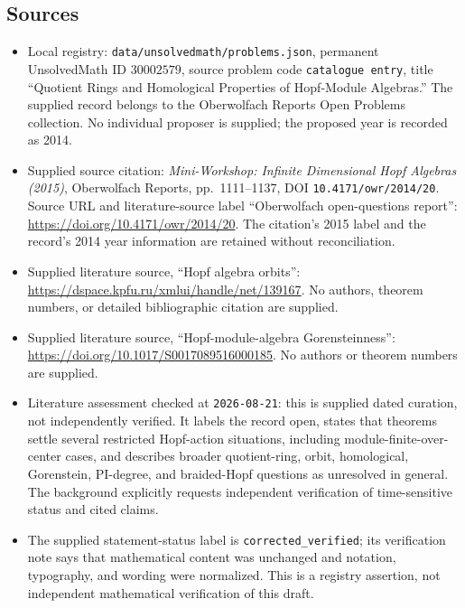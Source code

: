 \documentclass[11pt]{article}
\begin{document}
\subsection{Sources}
\begin{itemize}
\item Local registry: \texttt{data/unsolvedmath/problems.json}, permanent UnsolvedMath ID \(30002579\), source problem code \texttt{catalogue entry}, title ``Quotient Rings and Homological Properties of Hopf-Module Algebras.'' The supplied record belongs to the Oberwolfach Reports Open Problems collection. No individual proposer is supplied; the proposed year is recorded as 2014.
\item Supplied source citation: \emph{Mini-Workshop: Infinite Dimensional Hopf Algebras (2015)}, Oberwolfach Reports, pp.\ 1111--1137, DOI \texttt{10.4171/owr/2014/20}. Source URL and literature-source label ``Oberwolfach open-questions report'': \url{https://doi.org/10.4171/owr/2014/20}. The citation's 2015 label and the record's 2014 year information are retained without reconciliation.
\item Supplied literature source, ``Hopf algebra orbits'': \url{https://dspace.kpfu.ru/xmlui/handle/net/139167}. No authors, theorem numbers, or detailed bibliographic citation are supplied.
\item Supplied literature source, ``Hopf-module-algebra Gorensteinness'': \url{https://doi.org/10.1017/S0017089516000185}. No authors or theorem numbers are supplied.
\item Literature assessment checked at \texttt{2026-08-21}: this is supplied dated curation, not independently verified. It labels the record open, states that theorems settle several restricted Hopf-action situations, including module-finite-over-center cases, and describes broader quotient-ring, orbit, homological, Gorenstein, PI-degree, and braided-Hopf questions as unresolved in general. The background explicitly requests independent verification of time-sensitive status and cited claims.
\item The supplied statement-status label is \texttt{corrected\_verified}; its verification note says that mathematical content was unchanged and notation, typography, and wording were normalized. This is a registry assertion, not independent mathematical verification of this draft.
\end{itemize}
\end{document}
